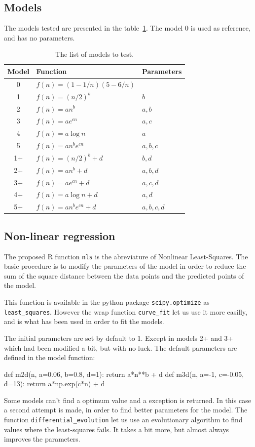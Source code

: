 \documentclass[a4paper]{article}
\begin{document}
\subsection{Models}

The models tested are presented in the table~\ref{tab:models}. The model 0 is 
used as reference, and has no parameters.
%
\begin{table}[h]
	\centering
	\begin{tabular}{cll}
		\toprule
		Model & Function & Parameters\\
		\midrule
		0  & $f(n) = (1-1/n)(5-6/n)$	& \\
		1  & $f(n) = (n/2)^b$					& $b$ \\
		2  & $f(n) = an^b$ 						& $a,b$\\
		3  & $f(n) = ae^{cn}$					& $a,c$\\
		4  & $f(n) = a\log n$					& $a$\\
		5  & $f(n) = an^be^{cn}$			& $a,b,c$\\
		1+ & $f(n) = (n/2)^b + d$			& $b,d$\\
		2+ & $f(n) = an^b + d$				& $a,b,d$\\
		3+ & $f(n) = ae^{cn} + d$			& $a,c,d$\\
		4+ & $f(n) = a\log n + d$			& $a,d$\\
		5+ & $f(n) = an^be^{cn} + d$	& $a,b,c,d$\\
		\bottomrule
	\end{tabular}
	\caption{The list of models to test.}
	\label{tab:models}
\end{table}
%

\subsection{Non-linear regression}

The proposed R function \texttt{nls} is the abreviature of Nonlinear 
Least-Squares. The basic procedure is to modify the parameters of the model in 
order to reduce the sum of the square distance between the data points and the 
predicted points of the model.

This function is available in the python package \texttt{scipy.optimize} as 
\texttt{least\_squares}. However the wrap function \texttt{curve\_fit} let us 
use it more easilly, and is what has been used in order to fit the models.

The initial parameters are set by default to 1. Except in models 2+ and 3+ which 
had been modified a bit, but with no luck. The default parameters are defined in 
the model function:
%
\begin{pycode}
def m2d(n, a=0.06, b=0.8, d=1):   return a*n**b + d
def m3d(n, a=-1, c=-0.05, d=13):  return a*np.exp(c*n) + d
\end{pycode}
%
Some models can't find a optimum value and a exception is returned. In this case 
a second attempt is made, in order to find better parameters for the model. The 
function \texttt{differential\_evolution} let us use an evolutionary algorithm 
to find values where the least-squares fails. It takes a bit more, but almost 
always improves the parameters.
\end{document}
